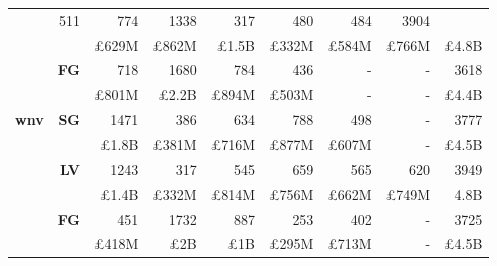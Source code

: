 \begin{table}[!htbp]
\begin{tabular}{r|r|r|r|r|r|r|r|r}
& {511} & {774} & {1338} & {317} & {480} & {484} & {3904}\\
& {} & {\pounds629M} & {\pounds862M} & {\pounds1.5B} & {\pounds332M} & {\pounds584M} & {\pounds766M} & {\pounds4.8B}\\
\cline{2-9}
& \multirow{2}{*}{\textbf{FG}}
& {718} & {1680} & {784} & {436} & {-} & {-} & {3618}\\
& {} & {\pounds801M} & {\pounds2.2B} & {\pounds894M} & {\pounds503M} & {-} & {-} & {\pounds4.4B}\\
\hline
\multirow{6}{*}{\textbf{wnv}}
& \multirow{2}{*}{\textbf{SG}}
& {1471} & {386} & {634} & {788} & {498} & {-} & {3777}\\
& {} & {\pounds1.8B} & {\pounds381M} & {\pounds716M} & {\pounds877M} & {\pounds607M} & {-} & {\pounds4.5B}\\
\cline{2-9}
& \multirow{2}{*}{\textbf{LV}}
& {1243} & {317} & {545} & {659} & {565} & {620} & {3949}\\
& {} & {\pounds1.4B} & {\pounds332M} & {\pounds814M} & {\pounds756M} & {\pounds662M} & {\pounds749M} & {4.8B}\\
\cline{2-9}
& \multirow{2}{*}{\textbf{FG}}
& {451} & {1732} & {887} & {253} & {402} & {-} & {3725}\\
& {} & {\pounds418M} & {\pounds2B} & {\pounds1B} & {\pounds295M} & {\pounds713M} & {-} & {\pounds4.5B}\\
\end{tabular}
\end{table}

